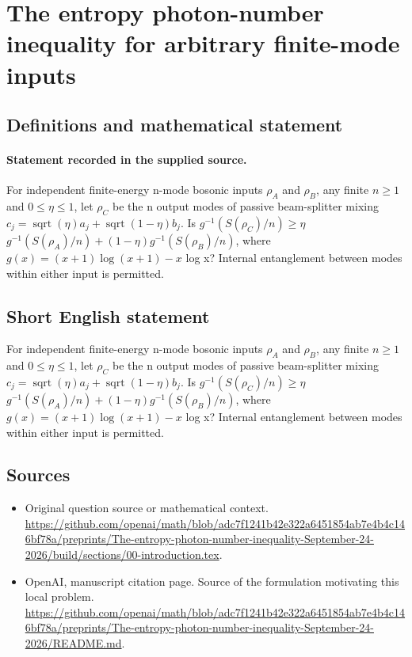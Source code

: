\documentclass[11pt]{article}
\begin{document}
\section*{The entropy photon-number inequality for arbitrary finite-mode inputs}\label{30007220}
\subsection{Definitions and mathematical statement}
\paragraph{Statement recorded in the supplied source.}
For independent finite-energy n-mode bosonic inputs $\rho _A$ and $\rho _B$, any finite $n\geq 1$ and $0\leq \eta \leq 1$, let $\rho _C$ be the n output modes of passive beam-splitter mixing $c_j=\operatorname{sqrt}(\eta )a_j+\operatorname{sqrt}(1-\eta )b_j$. Is $g^{-1}(S(\rho _C)/n)\geq \eta $ $g^{-1}(S(\rho _A)/n)+(1-\eta )g^{-1}(S(\rho _B)/n)$, where $g(x)=(x+1)\log (x+1)-x$ log x? Internal entanglement between modes within either input is permitted.
\subsection{Short English statement}
For independent finite-energy n-mode bosonic inputs $\rho _A$ and $\rho _B$, any finite $n\geq 1$ and $0\leq \eta \leq 1$, let $\rho _C$ be the n output modes of passive beam-splitter mixing $c_j=\operatorname{sqrt}(\eta )a_j+\operatorname{sqrt}(1-\eta )b_j$. Is $g^{-1}(S(\rho _C)/n)\geq \eta $ $g^{-1}(S(\rho _A)/n)+(1-\eta )g^{-1}(S(\rho _B)/n)$, where $g(x)=(x+1)\log (x+1)-x$ log x? Internal entanglement between modes within either input is permitted.
\subsection{Sources}
\begin{itemize}
\item[S1] Original question source or mathematical context.
\url{https://github.com/openai/math/blob/adc7f1241b42e322a6451854ab7e4b4c146bf78a/preprints/The-entropy-photon-number-inequality-September-24-2026/build/sections/00-introduction.tex}.
\item[S2] OpenAI, manuscript citation page. Source of the formulation motivating this local problem.
\url{https://github.com/openai/math/blob/adc7f1241b42e322a6451854ab7e4b4c146bf78a/preprints/The-entropy-photon-number-inequality-September-24-2026/README.md}.
\end{itemize}
\end{document}
